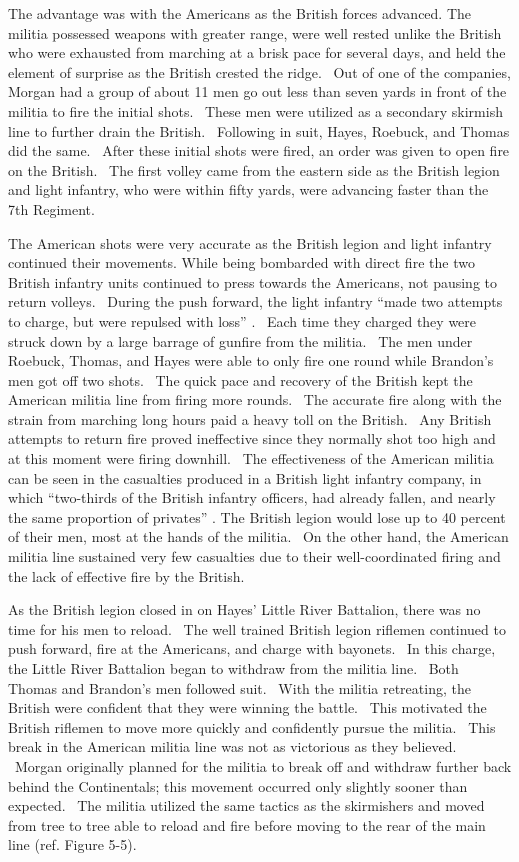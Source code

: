 The advantage was with the Americans as the British forces advanced.  The
militia possessed weapons with greater range, were well rested unlike the
British who were exhausted from marching at a brisk pace for several days, and
held the element of surprise as the British crested the ridge.  Out of one of
the companies, Morgan had a group of about 11 men go out less than seven yards
in front of the militia to fire the initial shots.  These men were utilized as a
secondary skirmish line to further drain the British.  Following in suit, Hayes,
Roebuck, and Thomas did the same.  After these initial shots were fired, an
order was given to open fire on the British.  The first volley came from the
eastern side as the British legion and light infantry, who were within fifty
yards, were advancing faster than the 7th Regiment.  

The American shots were very accurate as the British legion and light infantry
continued their movements.  While being bombarded with direct fire the two
British infantry units continued to press towards the Americans, not pausing to
return volleys.  During the push forward, the light infantry “made two attempts
to charge, but were repulsed with loss” \cite[p.92]{babits_devil_2001}.  Each time they charged
they were struck down by a large barrage of gunfire from the militia.  The men
under Roebuck, Thomas, and Hayes were able to only fire one round while
Brandon’s men got off two shots.  The quick pace and recovery of the British
kept the American militia line from firing more rounds.  The accurate fire along
with the strain from marching long hours paid a heavy toll on the British.  Any
British attempts to return fire proved ineffective since they normally shot too
high and at this moment were firing downhill.  The effectiveness of the American
militia can be seen in the casualties produced in a British light infantry
company, in which “two-thirds of the British infantry officers, had already
fallen, and nearly the same proportion of privates”
\cite[p.92]{babits_devil_2001}.  The British
legion would lose up to 40 percent of their men, most at the hands of the
militia.  On the other hand, the American militia line sustained very few
casualties due to their well-coordinated firing and the lack of effective fire
by the British.

As the British legion closed in on Hayes’ Little River Battalion, there was no
time for his men to reload.  The well trained British legion riflemen continued
to push forward, fire at the Americans, and charge with bayonets.  In this
charge, the Little River Battalion began to withdraw from the militia line.
 Both Thomas and Brandon’s men followed suit.  With the militia retreating, the
British were confident that they were winning the battle.  This motivated the
British riflemen to move more quickly and confidently pursue the militia.  This
break in the American militia line was not as victorious as they believed.
 Morgan originally planned for the militia to break off and withdraw further
back behind the Continentals; this movement occurred only slightly sooner than
expected.  The militia utilized the same tactics as the skirmishers and moved
from tree to tree able to reload and fire before moving to the rear of the main
line (ref. Figure 5-5).

